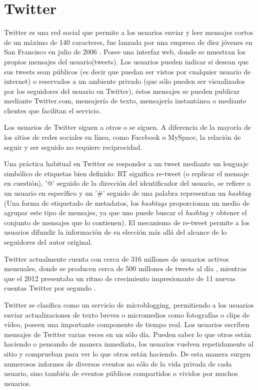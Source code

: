 \section{Twitter}

Twitter es una red social que permite a los usuarios enviar y leer mensajes cortos de un máximo de 140 caracteres, fue lanzada por una empresa de diez jóvenes en San Francisco en julio de 2006 . Posee una interfaz web, donde se muestran los propios mensajes del usuario(tweets). Los usuarios pueden indicar si desean que sus tweets sean públicos (es decir que puedan ser vistos por cualquier usuario de internet) o reservados a un ambiente privado (que sólo pueden ser visualizados por los seguidores del usuario en Twitter), éstos mensajes se pueden publicar mediante Twitter.com, mensajería de texto, mensajería instantánea o mediante clientes que facilitan el servicio.

Los usuarios de Twitter siguen a otros o se siguen. A diferencia de la mayoría de los sitios de redes sociales en línea, como Facebook o MySpace, la relación de seguir y ser seguido no requiere reciprocidad. 

Una práctica habitual en Twitter es responder a un tweet mediante un lenguaje simbólico de etiquetas bien definido: RT significa re-tweet (o replicar el mensaje en cuestión), '@' seguido de la dirección del identificador del usuario, se refiere a un usuario en específico y un '\#' seguido de una palabra representan un \emph{hashtag} (Una forma de etiquetado de metadatos, los \emph{hashtags} proporcionan un medio de agrupar este tipo de mensajes, ya que uno puede buscar el \emph{hashtag} y obtener el conjunto de mensajes que lo contienen). El mecanismo de re-tweet permite a los usuarios difundir la información de su elección más allá del alcance de lo seguidores del autor original.

Twitter actualmente cuenta con cerca de 316 millones de usuarios activos mensuales, donde se producen cerca de 500 millones de tweets al día \cite{cifrasTwitter}, mientras que el 2012 presentaba un ritmo de crecimiento impresionante de 11 nuevas cuentas Twitter por segundo \cite{infografiasLabs}.

Twitter se clasifica como un servicio de microblogging, permitiendo a los usuarios enviar actualizaciones de texto breves o micromedios como fotografías o clips de vídeo, poseen una importante componente de tiempo real. Los usuarios escriben mensajes de Twitter varias veces en un sólo día. Pueden saber lo que otros están haciendo o pensando de manera inmediata, los usuarios vuelven repetidamente al sitio y comprueban para ver lo que otros están haciendo. De esta manera surgen numerosos informes de diversos eventos no sólo de la vida privada de cada usuario, sino también de eventos públicos compartidos o vividos por muchos usuarios.

